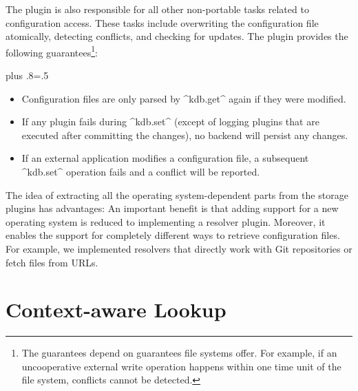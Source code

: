 The plugin  is also responsible for all other non-portable tasks related to configuration access.
These tasks include overwriting the configuration file atomically, detecting conflicts, and checking for updates.
The plugin  provides the following guarantees\footnote{
The guarantees depend on guarantees file systems offer.
For example, if an uncooperative external write operation happens within one time unit of the file system, conflicts cannot be detected.}:%
{\parfillskip=0pt plus .8\textwidth \emergencystretch=.5\textwidth \par}
\begin{itemize}
\item Configuration files are only parsed by ^kdb.get^ again if they were modified.
\item If any plugin fails during ^kdb.set^ (except of logging plugins that are executed after committing the changes), no backend will persist any changes.
\item If an external application modifies a configuration file, a subsequent ^kdb.set^ operation fails and a conflict will be reported.
\end{itemize}


The idea of extracting all the operating system-dependent parts from the storage plugins has advantages:
An important benefit is that adding support for a new operating system is reduced to implementing a resolver plugin.
Moreover, it enables the support for completely different ways to retrieve configuration files.
For example, we implemented resolvers that directly work with Git repositories or fetch files from URLs.







































\section{Context-aware Lookup}
\label{sec:backend-context-aware-lookup}

